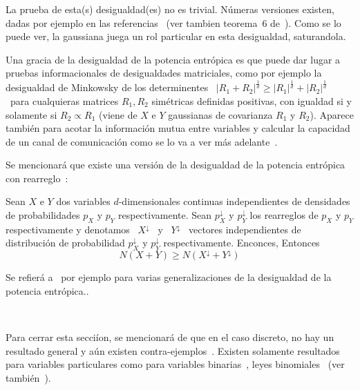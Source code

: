 La  prueba  de  esta(s)  desigualdad(es)  no es  trivial.   N\'umeras  versiones
existen,  dadas por  ejemplo  en las  referencias~\cite{Bla65, Sta59,  ShaWea64,
  Rio07,  Rio11,  Rio17,  CovTho06,  DemCov91,  Lie78,  VerGuo06}  (ver  tambien
teorema~6 de~\cite{Lie75}).   Como se  lo puede ver,  la gaussiana juega  un rol
particular en esta desigualdad, saturandola.

Una gracia de la desigualdad de la potencia entr\'opica es que puede dar lugar a
pruebas  informacionales  de  desigualdades  matriciales, como  por  ejemplo  la
desigualdad  de Minkowsky  de los  determinentes  \ $|R_1  + R_2|^{\frac1d}  \ge
|R_1|^{\frac1d}  +  |R_2|^{\frac1d}$  \  para cualquieras  matrices  $R_1,  R_2$
sim\'etricas definidas  positivas, con igualdad  si y solamente si  $R_2 \propto
R_1$  (viene de  $X$ e  $Y$ gaussianas  de covarianza  $R_1$ y  $R_2$).  Aparece
tambi\'en  para acotar  la informaci\'on  mutua  entre variables  y calcular  la
capacidad  de   un  canal  de  comunicaci\'on   como  se  lo  va   a  ver  m\'as
adelante~\cite{CovTho06, DemCov91, Rio07, Joh04}.

Se  mencionar\'a que  existe  una versi\'on  de  la desigualdad  de la  potencia
entr\'opica con rearreglo~\cite{WanMad04}:
%
\begin{teorema}
  Sean  $X$ e $Y$  dos variables  $d$-dimensionales continuas  independientes de
  densidades   de   probabilidades   $p_X$   y   $p_Y$   respectivamente.   Sean
  $p^\downarrow_X$  y   $p^\downarrow_Y$  los   rearreglos  de  $p_X$   y  $p_Y$
  respectivamente y denotamos  \ $X^\downarrow$ \ y \  $Y^\downarrow$ \ vectores
  independientes   de   distribuci\'on   de  probabilidad   $p^\downarrow_X$   y
  $p^\downarrow_Y$ respectivamente. Enconces, Entonces
  \[
  N(X + Y) \ge N(X^\downarrow + Y^\downarrow)
  \]
\end{teorema}

Se refier\'a a~\cite[y Ref.]{MadBar} por ejemplo para varias generalizaciones de
la desigualdad de la potencia entr\'opica..

\

Para cerrar esta secci\'ion, se mencionar\'a  de que en el caso discreto, no hay
un  resultado general  y a\'un  existen contra-ejemplos~\cite[Sec.~IV]{JohYu10}.
Existen  solamente resultados  para variables  particulares como  para variables
binarias~\cite{ShaWyn90},   leyes   binomiales~\cite{HarVig03,  ShaDas11}   (ver
tambi\'en~\cite{JohYu10, HagAbb14}).


